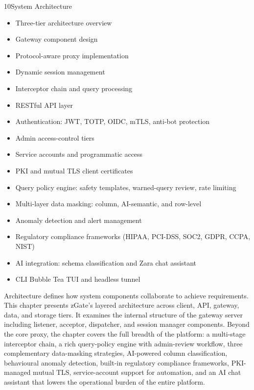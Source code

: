 
\begin{sectionintro}{10}{System Architecture}{
  \begin{itemize}[leftmargin=1.5em]
    \item Three-tier architecture overview
    \item Gateway component design
    \item Protocol-aware proxy implementation
    \item Dynamic session management
    \item Interceptor chain and query processing
    \item RESTful API layer
    \item Authentication: JWT, TOTP, OIDC, mTLS, anti-bot protection
    \item Admin access-control tiers
    \item Service accounts and programmatic access
    \item PKI and mutual TLS client certificates
    \item Query policy engine: safety templates, warned-query review, rate limiting
    \item Multi-layer data masking: column, AI-semantic, and row-level
    \item Anomaly detection and alert management
    \item Regulatory compliance frameworks (HIPAA, PCI-DSS, SOC2, GDPR, CCPA, NIST)
    \item AI integration: schema classification and Zara chat assistant
    \item CLI Bubble Tea TUI and headless tunnel
  \end{itemize}
}
Architecture defines how system components collaborate to achieve requirements. This chapter presents zGate's layered architecture across client, API, gateway, data, and storage tiers. It examines the internal structure of the gateway server including listener, acceptor, dispatcher, and session manager components. Beyond the core proxy, the chapter covers the full breadth of the platform: a multi-stage interceptor chain, a rich query-policy engine with admin-review workflow, three complementary data-masking strategies, AI-powered column classification, behavioural anomaly detection, built-in regulatory compliance frameworks, PKI-managed mutual TLS, service-account support for automation, and an AI chat assistant that lowers the operational burden of the entire platform.
\end{sectionintro}

